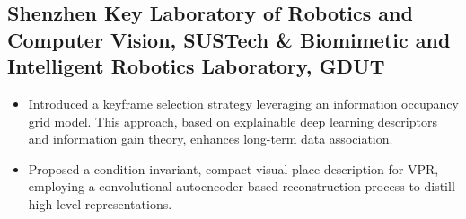 \documentclass[12pt,a4paper,sans]{moderncv} %
\newcommand\Colorhref[3][orange]{\href{#2}{\small\color{#1}#3}}
\begin{document}
\subsection{Shenzhen Key Laboratory of Robotics and Computer Vision, SUSTech \&  Biomimetic and Intelligent Robotics Laboratory, GDUT}

{
  \begin{itemize}
    \item Introduced a keyframe selection strategy leveraging an information occupancy grid model. This approach, based on explainable deep learning descriptors and information gain theory, enhances long-term data association.
    \item Proposed a condition-invariant, compact visual place description for VPR, employing a convolutional-autoencoder-based reconstruction process to distill high-level representations.
  \end{itemize}
}






\end{document}
